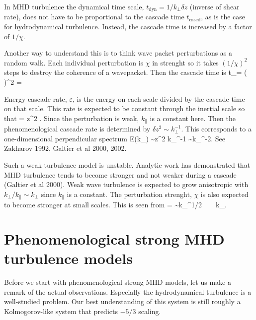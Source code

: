 \documentclass[usenatbib,twocolumn]{aastex63}
\newcommand{\tcascd}{t_\mathrm{cascd}} %
\begin{document}
In MHD turbulence the dynamical time scale, $t_\mathrm{dyn} = 1/k_\perp \delta z$ (inverse of shear rate), does not have to be proportional to the cascade time $\tcascd$, as is the case for hydrodynamical turbulence.
Instead, the cascade time is increased  by a factor of $1/\chi$.

Another way to understand this is to think wave packet perturbations as a random walk.
Each individual perturbation is $\chi$ in strenght so it takes $(1/\chi)^2$ steps to destroy the coherence of a wavepacket.
Then the cascade time is
\be
\tcascd =  \left(  \right)^2 = 
\ee

Energy cascade rate, $\varepsilon$, is the energy on each scale divided by the cascade time on that scale.
This rate is expected to be constant through the inertial scale so that
\be
\epsilon = \delta z^2 .
\ee
Since the perturbation is weak, $k_\parallel$ is a constant here.
Then the phenomenological cascade rate is determined by $\delta z^2 \sim k_\perp^{-1}$.
This corresponds to a one-dimensional perpendicular spectrum
\be
E(k_\perp) \sim \delta z^2 k_\perp^{-1} \sim k_\perp^{-2}.
\ee
See Zakharov 1992, Galtier et al 2000, 2002.


Such a weak turbulence model is unstable.
Analytic work has demonstrated that MHD turbulence tends to become stronger and not weaker during a cascade (Galtier et al 2000).
Weak wave turbulence is expected to grow anisotropic with $k_\perp/k_\parallel \sim k_\perp$ since $k_\parallel$ is a constant.
The perturbation strenght, $\chi$ is also expected to become stronger at small scales.
This is seen from
\be
\chi =  \sim k_\perp^{1/2} \rightarrow \infty ~ ~ k_\perp \rightarrow \infty.
\ee



\section{Phenomenological strong MHD turbulence models}\label{sect:theory}

Before we start with phenomenological strong MHD models, let us make a remark of the actual observations.
Especially the hydrodynamical turbulence is a well-studied problem.
Our best understanding of this system is still roughly a Kolmogorov-like system that predicts $-5/3$ scaling.
\end{document}
